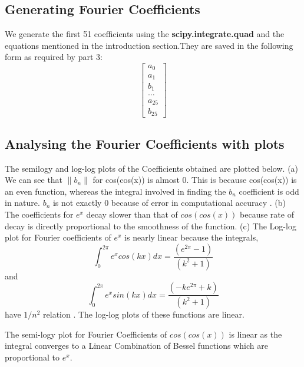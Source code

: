 \documentclass{article}
\begin{document}
\subsection{Generating Fourier Coefficients}
We generate the first 51 coefficients using the \textbf{scipy.integrate.quad} and the equations mentioned in the introduction section.They are saved in the following form as required by part 3:
\[
\begin{bmatrix}
    a_0 \\
    a_1 \\
    b_1 \\
    \dots \\
    a_{25} \\
    b_{25}
\end{bmatrix}
\]

\subsection{Analysing the Fourier Coefficients with plots}
The semilogy and log-log plots of the Coefficients obtained are plotted below. 
\newline
(a) We can see that $ \|b_n\|$ for cos(cos(x)) is almost 0. This is because cos(cos(x)) is an even function, whereas the integral involved in finding the $ b_n $ coefficient is odd in nature. $ b_n$ is not exactly 0 because of error in computational accuracy .\newline
(b) The coefficients for $e^x$ decay slower than that of $cos(cos(x))$ because rate of decay is directly proportional to the smoothness of the function. \newline
(c) The Log-log plot for Fourier coefficients of $e^x$ is nearly linear because the integrals,
\begin{equation}
\int_0^{2\pi} e^x cos(k x) dx = \frac{(e^{2\pi} - 1)}{(k^2 + 1)}    
\end{equation}
and 
\begin{equation}
\int_0^{2\pi} e^x sin(k x) dx = \frac{(-ke^{2\pi} + k)}{(k^2 + 1)}    
\end{equation}
have $1/n^2$ relation . The log-log plots of these functions are linear.

The semi-logy plot for Fourier Coefficients of $cos(cos(x))$ is linear as the integral converges to a Linear Combination of Bessel functions which are proportional to $e^x$.
\end{document}
